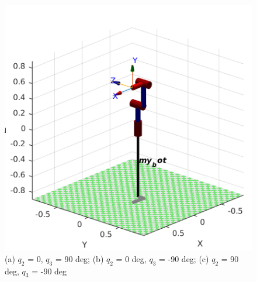 \documentclass{article}
\begin{document}
\begin{center}
\begin{figure}[!htb]
\begin{minipage}{0.33\textwidth}
   \end{minipage}\hfill
   \begin{minipage}{0.33\textwidth}
     \centering
     \includegraphics[width=\linewidth]{images/frame3_q2_90_q3_-90.png}
   \end{minipage}
   \caption{(a) $q_2$ = 0, $q_3$ = 90 deg; (b) $q_2$ = 0 deg, $q_3$ = -90 deg; (c) $q_2$ = 90 deg, $q_3$ = -90 deg}

\end{figure} 
\end{center}
\FloatBarrier
\end{document}
